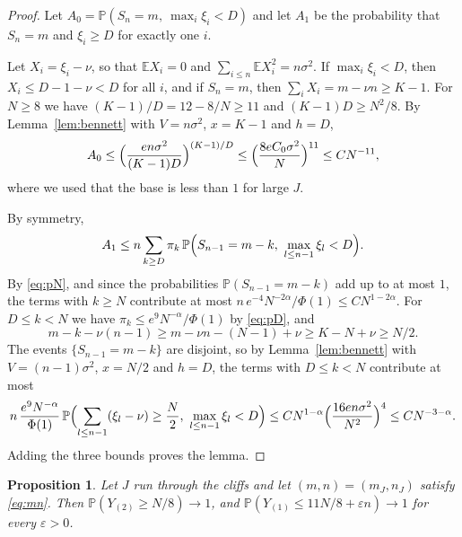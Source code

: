 \documentclass[11pt]{amsart}
\newtheorem{proposition}[theorem]{Proposition}
\theoremstyle{remark}
\numberwithin{equation}{section}
\newcommand{\Pp}{\mathbb P}
\newcommand{\E}{\mathbb E}
\begin{document}
\begin{proof}
Let $A_0=\Pp(S_n=m,\ \max_i\xi_i<D)$ and let $A_1$ be the probability that $S_n=m$ and $\xi_i\ge D$ for exactly one $i$.

Let $X_i=\xi_i-\nu$, so that $\E X_i=0$ and $\sum_{i\le n}\E X_i^2=n\sigma^2$. If $\max_i\xi_i<D$, then $X_i\le D-1-\nu<D$ for all $i$, and if $S_n=m$, then $\sum_iX_i=m-\nu n\ge K-1$. For $N\ge8$ we have $(K-1)/D=12-8/N\ge11$ and $(K-1)D\ge N^2/8$. By Lemma~\ref{lem:bennett} with $V=n\sigma^2$, $x=K-1$ and $h=D$,
\[
A_0\le\Bigl(\frac{en\sigma^2}{(K-1)D}\Bigr)^{(K-1)/D}\le\Bigl(\frac{8eC_0\sigma^2}N\Bigr)^{11}\le CN^{-11},
\]
where we used that the base is less than $1$ for large $J$.

By symmetry,
\[
A_1\le n\sum_{k\ge D}\pi_k\,\Pp\Bigl(S_{n-1}=m-k,\ \max_{l\le n-1}\xi_l<D\Bigr).
\]
By \eqref{eq:pN}, and since the probabilities $\Pp(S_{n-1}=m-k)$ add up to at most $1$, the terms with $k\ge N$ contribute at most $n\,e^{-4}N^{-2\alpha}/\Phi(1)\le CN^{1-2\alpha}$. For $D\le k<N$ we have $\pi_k\le e^9N^{-\alpha}/\Phi(1)$ by \eqref{eq:pD}, and
\[
m-k-\nu(n-1)\ge m-\nu n-(N-1)+\nu\ge K-N+\nu\ge N/2.
\]
The events $\{S_{n-1}=m-k\}$ are disjoint, so by Lemma~\ref{lem:bennett} with $V=(n-1)\sigma^2$, $x=N/2$ and $h=D$, the terms with $D\le k<N$ contribute at most
\[
n\,\frac{e^9N^{-\alpha}}{\Phi(1)}\,\Pp\Bigl(\sum_{l\le n-1}(\xi_l-\nu)\ge\frac N2,\ \max_{l\le n-1}\xi_l<D\Bigr)\le CN^{1-\alpha}\Bigl(\frac{16en\sigma^2}{N^2}\Bigr)^4\le CN^{-3-\alpha}.
\]
Adding the three bounds proves the lemma.
\end{proof}

\begin{proposition}\label{prop:main}
Let $J$ run through the cliffs and let $(m,n)=(m_J,n_J)$ satisfy \eqref{eq:mn}. Then $\Pp(Y_{(2)}\ge N/8)\to1$, and $\Pp(Y_{(1)}\le11N/8+\varepsilon n)\to1$ for every $\varepsilon>0$.
\end{proposition}
\end{document}
